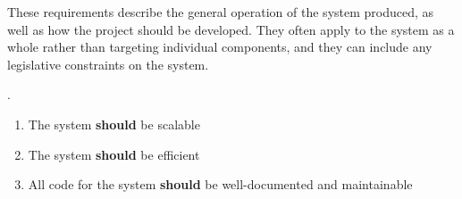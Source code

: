 
These requirements describe the general operation of the system produced, as well as how the project should be developed. They often apply to the system as a whole rather than targeting individual components, and they can include any legislative constraints on the system.

 \cite{software_engineering_req_analysis}.

 \begin{enumerate}[label=\textbf{NF\arabic*:}]
     \item The system \textbf{should} be scalable
     \item The system \textbf{should} be efficient
     \item All code for the system \textbf{should} be well-documented and maintainable
 \end{enumerate}

